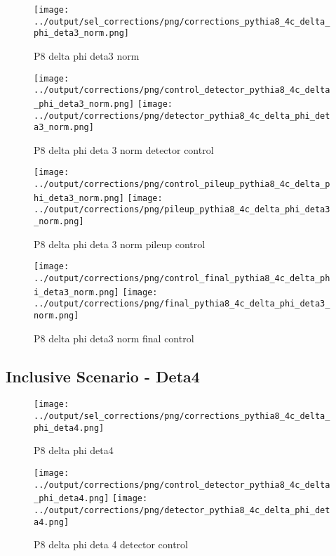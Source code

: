 \documentclass[11pt]{book}
\begin{document}
\begin{figure}[ht]
\centering
\texttt{[image: ../output/sel\_corrections/png/corrections\_pythia8\_4c\_delta\_phi\_deta3\_norm.png]}
\caption{P8 delta phi deta3 norm}
\label{fig:p8_delta_phi_deta3_norm}
\end{figure}

\begin{figure}[ht]
\centering
\texttt{[image: ../output/corrections/png/control\_detector\_pythia8\_4c\_delta\_phi\_deta3\_norm.png]}
\texttt{[image: ../output/corrections/png/detector\_pythia8\_4c\_delta\_phi\_deta3\_norm.png]}
\caption{P8 delta phi deta 3 norm detector control}
\label{fig:p8_delta_phi_deta3_norm_detector_control}
\end{figure}

\begin{figure}[ht]
\centering
\texttt{[image: ../output/corrections/png/control\_pileup\_pythia8\_4c\_delta\_phi\_deta3\_norm.png]}
\texttt{[image: ../output/corrections/png/pileup\_pythia8\_4c\_delta\_phi\_deta3\_norm.png]}
\caption{P8 delta phi deta 3 norm pileup control}
\label{fig:p8_delta_phi_deta3_norm_pileup_control}
\end{figure}


\begin{figure}[ht]
\centering
\texttt{[image: ../output/corrections/png/control\_final\_pythia8\_4c\_delta\_phi\_deta3\_norm.png]}
\texttt{[image: ../output/corrections/png/final\_pythia8\_4c\_delta\_phi\_deta3\_norm.png]}
\caption{P8 delta phi deta3 norm final control}
\label{fig:p8_delta_phi_deta3_norm_final_control}
\end{figure}


\clearpage
\subsection{Inclusive Scenario - Deta4}
\begin{figure}[ht]
\centering
\texttt{[image: ../output/sel\_corrections/png/corrections\_pythia8\_4c\_delta\_phi\_deta4.png]}
\caption{P8 delta phi deta4}
\label{fig:p8_delta_phi_deta4}
\end{figure}


\begin{figure}[ht]
\centering
\texttt{[image: ../output/corrections/png/control\_detector\_pythia8\_4c\_delta\_phi\_deta4.png]}
\texttt{[image: ../output/corrections/png/detector\_pythia8\_4c\_delta\_phi\_deta4.png]}
\caption{P8 delta phi deta 4 detector control}
\label{fig:p8_delta_phi_deta4_detector_control}
\end{figure}
\end{document}
